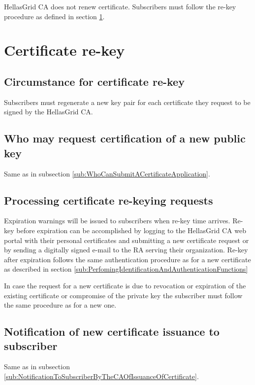 HellasGrid CA does not renew certificate. Subscribers must follow the re-key procedure as defined in section \ref{sec:CertificateRe-key}.

\section{Certificate re-key}
\label{sec:CertificateRe-key}

\subsection{Circumstance for certificate re-key}
\label{sub:CircumstanceForCertificateRe-key}

Subscribers must regenerate a new key pair for each certificate they request to be signed by the HellasGrid CA.

\subsection{Who may request certification of a new public key}

Same as in subsection \ref{sub:WhoCanSubmitACertificateApplication}.

\subsection{Processing certificate re-keying requests}

Expiration warnings will be issued to subscribers when re-key time arrives. Re-key before expiration can be accomplished by logging to the HellasGrid CA web portal with their personal certificates and submitting a new certificate request or by sending a digitally signed e-mail to the RA serving their organization. Re-key after expiration follows the same authentication procedure as for a new certificate as described in section \ref{sub:PerfomingIdentificationAndAuthenticationFunctions} 

In case the request for a new certificate is due to revocation or expiration of the existing certificate or compromise of the private key the subscriber must follow the same procedure as for a new one.

\subsection{Notification of new certificate issuance to subscriber}

Same as in subsection \ref{sub:NotificationToSubscriberByTheCAOfIssuanceOfCertificate}. 

